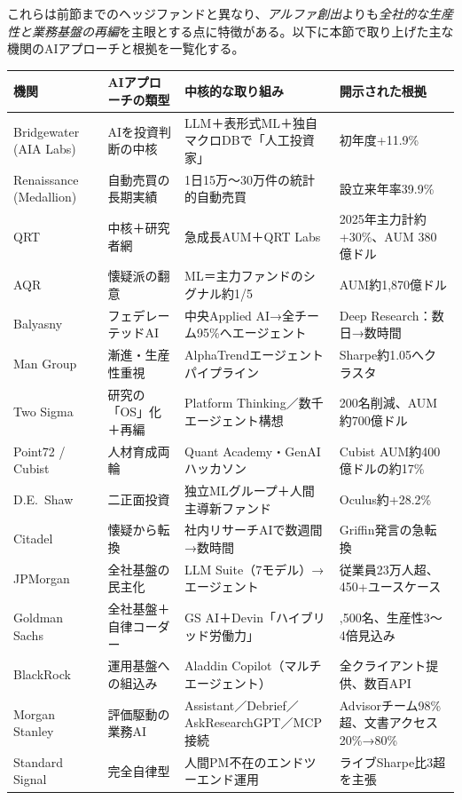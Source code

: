 これらは前節までのヘッジファンドと異なり、\emph{アルファ創出}よりも\emph{全社的な生産性と業務基盤の再編}を主眼とする点に特徴がある。以下に本節で取り上げた主な機関のAIアプローチと根拠を一覧化する。

\begin{center}
\footnotesize
\begin{tabularx}{\textwidth}{@{}>{\raggedright\arraybackslash}p{2.9cm} >{\raggedright\arraybackslash}p{2.6cm} >{\raggedright\arraybackslash}X >{\raggedright\arraybackslash}p{3.0cm}@{}}
\toprule
\textbf{機関} & \textbf{AIアプローチの類型} & \textbf{中核的な取り組み} & \textbf{開示された根拠} \\
\midrule
Bridgewater (AIA Labs) & AIを投資判断の中核 & LLM＋表形式ML＋独自マクロDBで「人工投資家」 & 初年度+11.9\%\cite{bridgewater_aialabs_nd} \\
Renaissance (Medallion) & 自動売買の長期実績 & 1日15万〜30万件の統計的自動売買 & 設立来年率39.9\%\cite{institutionalinvestor2025renaissance} \\
QRT & 中核＋研究者網 & 急成長AUM＋QRT Labs & 2025年主力計約+30\%、AUM 380億ドル\cite{bloomberg_qube2026} \\
AQR & 懐疑派の翻意 & ML＝主力ファンドのシグナル約1/5 & AUM約1,870億ドル\cite{x03aqr_bloomberg2025,x03forbes_billionaires2026} \\
Balyasny & フェデレーテッドAI & 中央Applied AI→全チーム95\%へエージェント & Deep Research：数日→数時間\cite{x03balyasny_openai2026} \\
Man Group & 漸進・生産性重視 & AlphaTrendエージェントパイプライン & Sharpe約1.05へクラスタ\cite{manndalphatrend} \\
Two Sigma & 研究の「OS」化＋再編 & Platform Thinking／数千エージェント構想 & 200名削減、AUM約700億ドル\cite{x03twosigma_hedgeweek2026} \\
Point72 / Cubist & 人材育成両輪 & Quant Academy・GenAIハッカソン & Cubist AUM約400億ドルの約17\%\cite{bloomberg_cubistchief2025} \\
D.E.\ Shaw & 二正面投資 & 独立MLグループ＋人間主導新ファンド & Oculus約+28.2\%\cite{bloomberg_deshaw2025} \\
Citadel & 懐疑から転換 & 社内リサーチAIで数週間→数時間 & Griffin発言の急転換\cite{griffin2026} \\
JPMorgan & 全社基盤の民主化 & LLM Suite（7モデル）→エージェント & 従業員23万人超、450+ユースケース\cite{x03jpmorgan_cnbc2025} \\
Goldman Sachs & 全社基盤＋自律コーダー & GS AI＋Devin「ハイブリッド労働力」 & 46,500名、生産性3〜4倍見込み\cite{x03goldman_cnbc2025} \\
BlackRock & 運用基盤への組込み & Aladdin Copilot（マルチエージェント） & 全クライアント提供、数百API\cite{x03blackrock_aladdincopilot} \\
Morgan Stanley & 評価駆動の業務AI & Assistant／Debrief／AskResearchGPT／MCP接続 & Advisorチーム98\%超、文書アクセス20\%→80\%\cite{x03morganstanley_openai2026} \\
Standard Signal & 完全自律型 & 人間PM不在のエンドツーエンド運用 & ライブSharpe比3超を主張\cite{ycombinator2026standardsignal} \\
\bottomrule
\end{tabularx}
\end{center}

